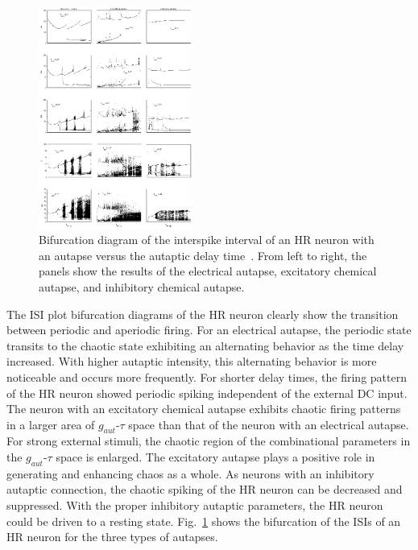 \documentclass[twocolumn,showpacs,preprintnumbers,amsmath,amssymb,pre,superscriptaddress]{revtex4-1}
\begin{document}
\begin{CJK}{UTF8}{gbsn}
\begin{figure}
\begin{center}
\includegraphics[width=0.45\textwidth]{fig4_bifurcation.eps}
\end{center}
\caption{Bifurcation diagram of the interspike interval of an HR neuron with an autapse versus the autaptic delay time~\cite{wht2014a}. From left to right, the panels show the results of the electrical autapse, excitatory chemical autapse, and inhibitory chemical autapse.}
\label{hr_e2}
\end{figure}

The ISI plot bifurcation diagrams of the HR neuron clearly show the transition between periodic and aperiodic firing. For an electrical autapse, the periodic state transits to the chaotic state exhibiting an alternating behavior as the time delay increased. With higher autaptic intensity, this alternating behavior is more noticeable and occurs more frequently. For shorter delay times, the firing pattern of the HR neuron showed periodic spiking independent of the external DC input. The neuron with an excitatory chemical autapse exhibits chaotic firing patterns in a larger area of $g_{aut}$-$\tau$ space than that of the neuron with an electrical autapse. For strong external stimuli, the chaotic region of the combinational parameters in the $g_{aut}$-$\tau$ space is enlarged. The excitatory autapse plays a positive role in generating and enhancing chaos as a whole. As neurons with an inhibitory autaptic connection, the chaotic spiking of the HR neuron can be decreased and suppressed. With the proper inhibitory autaptic parameters, the HR neuron could be driven to a resting state. Fig.~\ref{hr_e2} shows the bifurcation of the ISIs of an HR neuron for the three types of autapses. 


\end{CJK}
\end{document}
